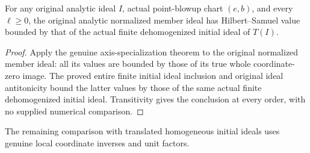 \begin{theorem}
\label{hir:actual-point-normalized-hs-le-dehomogenized-initial}
\leanok
For any original analytic ideal $I$, actual point-blowup chart $(e,b)$,
and every $\ell\ge0$, the original analytic normalized member ideal has
Hilbert--Samuel value bounded by that of the actual finite dehomogenized
initial ideal of $T(I)$.
\end{theorem}
\begin{proof}
Apply the genuine axis-specialization theorem to the original normalized
member ideal: all its values are bounded by those of its true whole
coordinate-zero image. The proved entire finite initial ideal inclusion
and original ideal antitonicity bound the latter values by those of the
same actual finite dehomogenized initial ideal. Transitivity gives the
conclusion at every order, with no supplied numerical comparison.
\end{proof}

The remaining comparison with translated homogeneous initial ideals
uses genuine local coordinate inverses and unit factors.

